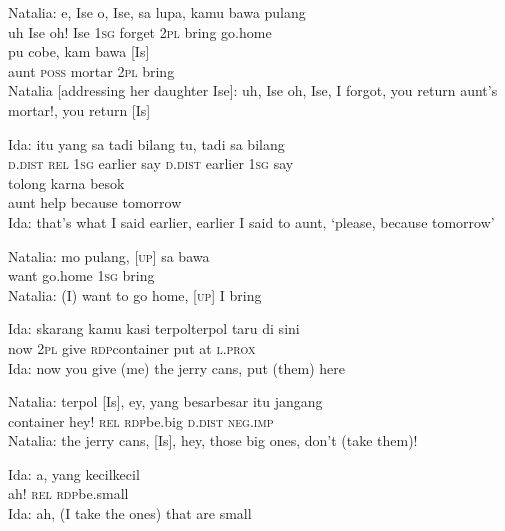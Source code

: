 \ea
\gll   Natalia:    {e,}    {Ise}   o,    {Ise,}    {sa}    {lupa,}   kamu   bawa   pulang\\
{}      {uh}    {Ise}   oh!    {Ise}    {\textsc{1sg}}    {forget}   \textsc{2pl}   bring   go.home\\
    {pu}    {cobe,}    {kam}    {bawa}    {[Is]}\\
   {aunt}    {\textsc{poss}}    {mortar}    {\textsc{2pl}}    {bring}    {}\\
\glt
Natalia [addressing her daughter Ise]: uh, Ise oh, Ise, I forgot, you return aunt’s mortar!, you return [Is]
\z

\ea
\gll   Ida:    {itu}   yang   sa    {tadi}   bilang   tu,   tadi   sa   bilang\\
{}     {\textsc{d.dist}}   \textsc{rel}   \textsc{1sg}    {earlier}   say   \textsc{d.dist}   earlier   \textsc{1sg}   say\\
    {tolong}    {karna}    {besok}\\
   {aunt}    {help}    {because}    {tomorrow}\\
\glt
Ida: that’s what I said earlier, earlier I said to aunt, ‘please, because tomorrow’
\z

\ea
\gll   Natalia:   mo   pulang,   {\upshape\textsc{[up]}}   sa   bawa\\
{}  want   go.home   {}   \textsc{1sg}   bring\\
\glt
Natalia: (I) want to go home, [\textsc{up}] I bring
\z

\ea
\gll   Ida:   skarang   kamu   kasi   terpol{\Tilde}terpol   taru   di   sini\\
 {}  now   \textsc{2pl}   give   \textsc{rdp}{\Tilde}container   put   at   \textsc{l.prox}\\
\glt
Ida: now you give (me) the jerry cans, put (them) here
\z

\ea
\gll   Natalia:   terpol   [Is],   ey,   yang   besar{\Tilde}besar   itu   jangang\\
{}   container  {}    hey!   \textsc{rel}   \textsc{rdp}{\Tilde}be.big   \textsc{d.dist}   \textsc{neg.imp}\\
\glt
Natalia: the jerry cans, [Is], hey, those big ones, don’t (take them)!
\z

\ea
\gll   Ida:   a,   yang   kecil{\Tilde}kecil\\
{}   ah!   \textsc{rel}   \textsc{rdp}{\Tilde}be.small\\
\glt
Ida: ah, (I take the ones) that are small
\z

